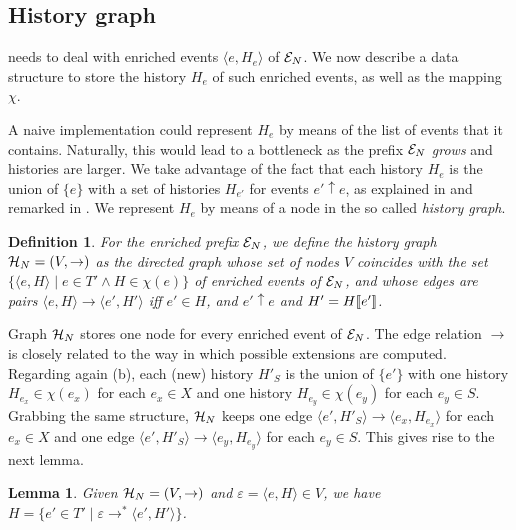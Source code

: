 \documentclass[11pt,a4paper]{article}
\newtheorem{definition}[theorem]{Definition}
\newtheorem{lemma}[theorem]{Lemma}
\begin{document}
\subsection{History graph}
\label{sec:history.graph}

 needs to deal with enriched events $\langle e, H_e
\rangle$ of $\mathcal{E}_{N}$.  We now describe a data structure to store the history
$H_e$ of such enriched events, as well as the mapping $\chi$.

A naive implementation could represent $H_e$ by means of the list of events
that it contains.  Naturally, this would lead to a bottleneck as the prefix
$\mathcal{E}_{N}$ \textit{grows} and histories are larger.  We take advantage of the
fact that each history $H_e$ is the union of $\{e\}$ with a set of histories
$H_{e'}$ for events $e' \uparrow e$, as explained in
 and remarked in .  We
represent $H_e$ by means of a node in the so called \emph{history graph}.

\begin{definition}
For the enriched prefix $\mathcal{E}_{N}$, we define the \emph{history graph} $\mathcal{H}_{N} =
(V, \to)$ as the directed graph whose set of nodes $V$ coincides with the set
$\{\langle e, H \rangle \mid e \in T' \land H \in \chi (e)\}$ of enriched
events of $\mathcal{E}_{N}$, and whose edges are pairs $\langle e, H \rangle \to \langle
e', H' \rangle$ iff $e' \in H$, and $e' \uparrow e$ and $H' = H [\![ e']\!]$.
\end{definition}

Graph $\mathcal{H}_{N}$ stores one node for every enriched event of $\mathcal{E}_{N}$.  The edge
relation $\to$ is closely related to the way in which possible extensions are
computed.  Regarding again  (b), each (new) history
$H'_S$ is the union of $\{e'\}$ with one history $H_{e_x} \in \chi (e_x)$ for
each $e_x \in X$ and one history $H_{e_y} \in \chi (e_y)$ for each $e_y \in S$.
Grabbing the same structure, $\mathcal{H}_{N}$ keeps one edge $\langle e', H'_S \rangle
\to \langle e_x, H_{e_x} \rangle$ for each $e_x \in X$ and one edge $\langle
e', H'_S \rangle \to \langle e_y, H_{e_y} \rangle$ for each $e_y \in S$.  This
gives rise to the next lemma.

\begin{lemma}
\label{lem:given.hst}
Given $\mathcal{H}_{N} = (V, \to)$ and $\varepsilon = \langle e, H \rangle \in V$, we
have $H = \{e' \in T' \mid \varepsilon \to^* \langle e', H' \rangle\}$.
\end{lemma}
\end{document}
